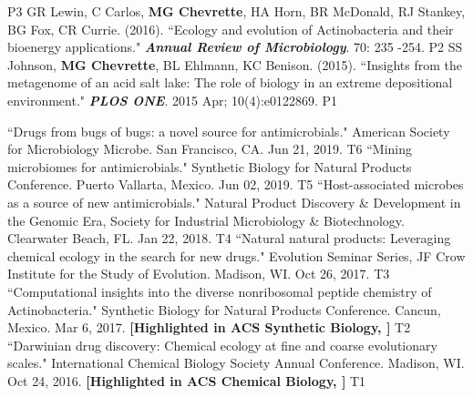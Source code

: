 \begin{cvpubs}
    {P3} %
  \cvpub
    {GR Lewin, C Carlos, \textbf{MG Chevrette}, HA Horn, BR McDonald, RJ Stankey, BG Fox, CR Currie. (2016). ``Ecology and evolution of Actinobacteria and their bioenergy applications." \textit{\textbf{Annual Review of Microbiology}}. 70: 235 -254. \textbf{\textit{}} } %
    {P2} %
  \cvpub
    {SS Johnson, \textbf{MG Chevrette}, BL Ehlmann, KC Benison. (2015). ``Insights from the metagenome of an acid salt lake: The role of biology in an extreme depositional environment."  \textit{\textbf{PLOS ONE}}. 2015 Apr; 10(4):e0122869. \textbf{\textit{}} } %
    {P1} %
\end{cvpubs}

\begin{cvpubs}
  \cvpub
    {``Drugs from bugs of bugs: a novel source for antimicrobials." American Society for Microbiology Microbe. San Francisco, CA. Jun 21, 2019.} %
    {T6} %
  \cvpub
    {``Mining microbiomes for antimicrobials." Synthetic Biology for Natural Products Conference. Puerto Vallarta, Mexico. Jun 02, 2019.} %
    {T5} %
  \cvpub
    {``Host-associated microbes as a source of new antimicrobials." Natural Product Discovery \& Development in the Genomic Era, Society for Industrial Microbiology \& Biotechnology. Clearwater Beach, FL. Jan 22, 2018.} %
    {T4} %
  \cvpub
    {``Natural natural products: Leveraging chemical ecology in the search for new drugs." Evolution Seminar Series, JF Crow Institute for the Study of Evolution. Madison, WI. Oct 26, 2017.} %
    {T3} %
  \cvpub
    {``Computational insights into the diverse nonribosomal peptide chemistry of Actinobacteria." Synthetic Biology for Natural Products Conference. Cancun, Mexico. Mar 6, 2017.
	\linebreak \textbf{[Highlighted in ACS Synthetic Biology, \textit{}]}    
    } %
    {T2} %
  \cvpub
    {``Darwinian drug discovery: Chemical ecology at fine and coarse evolutionary scales." International Chemical Biology Society Annual Conference. Madison, WI. Oct 24, 2016.
	\linebreak \textbf{[Highlighted in ACS Chemical Biology, \textit{}]}     
    } %
    {T1} %
\end{cvpubs}

